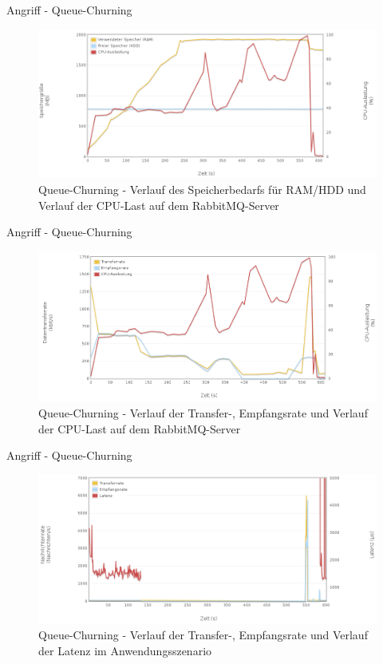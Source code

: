 \documentclass[10pt]{beamer}
\begin{document}
\begin{frame}{Angriff - Queue-Churning}
\begin{figure}[!htb]
	\centering
	\includegraphics[width=\textwidth]{img/queue/queue_server1.png}
	\caption{\centering Queue-Churning - Verlauf des Speicherbedarfs für RAM/HDD und Verlauf der CPU-Last auf dem RabbitMQ-Server}
	\label{fig:queue-server1}
\end{figure}
\end{frame}
		
\begin{frame}{Angriff - Queue-Churning}
\begin{figure}[!htb]
	\centering
	\includegraphics[width=\textwidth]{img/queue/queue_server2.png}
	\caption{\centering Queue-Churning - Verlauf der Transfer-, Empfangsrate und Verlauf der CPU-Last auf dem RabbitMQ-Server}
	\label{fig:queue-server2}
\end{figure}
\end{frame}
	
\begin{frame}{Angriff - Queue-Churning}	
\begin{figure}[!htb]
	\centering
	\includegraphics[width=\textwidth]{img/queue/queue_scenario.png}
	\caption{\centering Queue-Churning - Verlauf der Transfer-, Empfangsrate und Verlauf der Latenz im Anwendungsszenario}
	\label{fig:queue-scenario}
\end{figure}
\end{frame}
\end{document}
